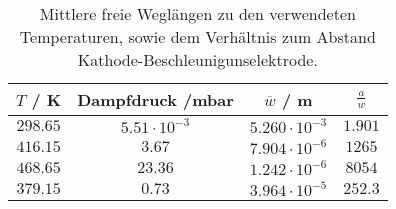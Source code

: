 \begin{table}[!htp]
\centering
\caption{Mittlere freie Weglängen zu den verwendeten Temperaturen, sowie dem Verhältnis zum Abstand Kathode-Beschleunigunselektrode.}
\label{tab:weglaenge}
\begin{tabular}{c c c c}
\toprule
{{$T$ / K}} & {{Dampfdruck /mbar}} & {{$\overline{w}$ / m}} & {{$\frac{a}{w}$}} \\
\midrule
$298.65$ & $5.51\cdot 10^{-3} $ & $5.260 \cdot 10^{-3}  $ &  $ 1.901$\\
$416.15$ & $3.67 $ & $7.904 \cdot 10^{-6} $  & $  1265 $ \\
$468.65$ & $23.36$ & $1.242 \cdot 10^{-6} $  & $  8054 $ \\
$379.15$ & $0.73 $ & $3.964 \cdot 10^{-5}  $ &  $ 252.3 $ \\
\bottomrule
\end{tabular}
\end{table}